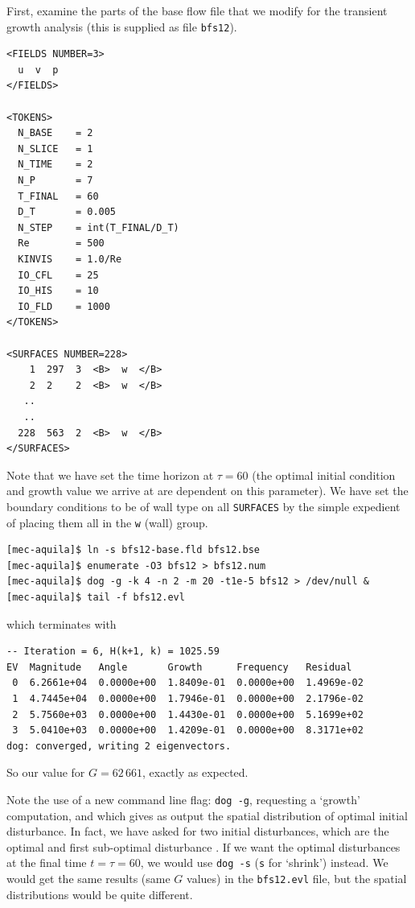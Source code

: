 \documentclass[11pt,a4paper]{report}
\begin{document}
First, examine the parts of the base flow file that we modify for the
transient growth analysis (this is supplied as file \verb+bfs12+).
{\small
\begin{verbatim}
<FIELDS NUMBER=3>
  u  v  p
</FIELDS>

<TOKENS>
  N_BASE    = 2
  N_SLICE   = 1
  N_TIME    = 2
  N_P       = 7
  T_FINAL   = 60
  D_T       = 0.005
  N_STEP    = int(T_FINAL/D_T)
  Re        = 500
  KINVIS    = 1.0/Re
  IO_CFL    = 25
  IO_HIS    = 10
  IO_FLD    = 1000
</TOKENS>

<SURFACES NUMBER=228>
    1  297  3  <B>  w  </B>
    2  2    2  <B>  w  </B>
   ..
   ..
  228  563  2  <B>  w  </B>
</SURFACES>
\end{verbatim}
}\noindent Note that we have set the time horizon at $\tau=60$ (the
optimal initial condition and growth value we arrive at are dependent
on this parameter).  We have set the boundary conditions to be of wall
type on all \verb+SURFACES+ by the simple expedient of placing them
all in the \verb+w+ (wall) group.
\begin{verbatim}
[mec-aquila]$ ln -s bfs12-base.fld bfs12.bse
[mec-aquila]$ enumerate -O3 bfs12 > bfs12.num
[mec-aquila]$ dog -g -k 4 -n 2 -m 20 -t1e-5 bfs12 > /dev/null &
[mec-aquila]$ tail -f bfs12.evl
\end{verbatim}
which terminates with
{\small
\begin{verbatim}
-- Iteration = 6, H(k+1, k) = 1025.59
EV  Magnitude   Angle       Growth      Frequency   Residual
 0  6.2661e+04  0.0000e+00  1.8409e-01  0.0000e+00  1.4969e-02
 1  4.7445e+04  0.0000e+00  1.7946e-01  0.0000e+00  2.1796e-02
 2  5.7560e+03  0.0000e+00  1.4430e-01  0.0000e+00  5.1699e+02
 3  5.0410e+03  0.0000e+00  1.4209e-01  0.0000e+00  8.3171e+02
dog: converged, writing 2 eigenvectors.
\end{verbatim}
}\noindent So our value for $G=62\,661$, exactly as expected.  

Note the use of a new command line flag: \verb+dog -g+, requesting a
`growth' computation, and which gives as output the spatial
distribution of optimal initial disturbance.  In fact, we have asked
for two initial disturbances, which are the optimal and first
sub-optimal disturbance \citep[see \S\,4.2.1 and table~5
  of][]{bbs08a}.  If we want the optimal disturbances at the final
time $t=\tau=60$, we would use \verb+dog -s+ (\verb+s+ for `shrink')
instead.  We would get the same results (same $G$ values) in the
\verb+bfs12.evl+ file, but the spatial distributions would be quite
different.
\end{document}
